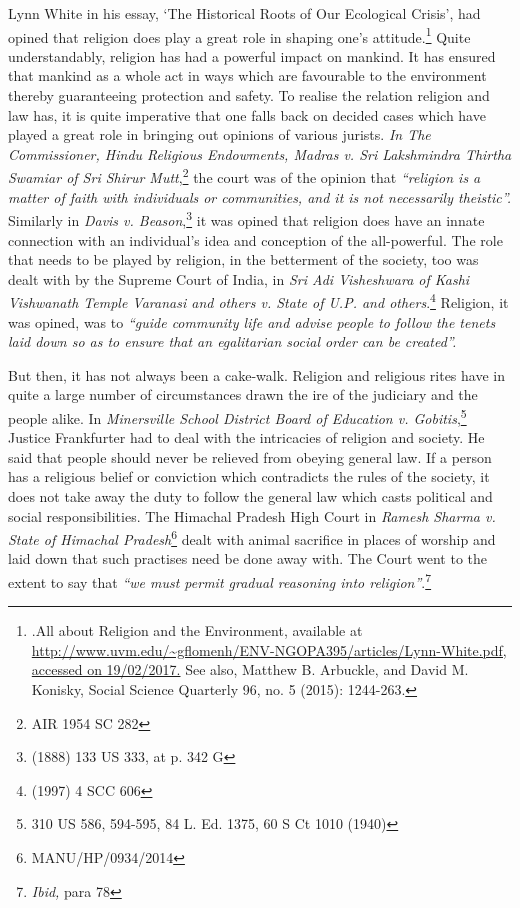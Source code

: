 \begin{multicols}{2}

\noi
Lynn White in his essay, ‘The Historical Roots of Our Ecological Crisis’, had opined that
religion does play a great role in shaping one’s attitude.\footnote{.All about Religion and the Environment, available at \url{http://www.uvm.edu/~gflomenh/ENV-NGOPA395/articles/Lynn-White.pdf, accessed on 19/02/2017.} See also, Matthew B. Arbuckle, and David M. Konisky, Social Science Quarterly 96, no. 5 (2015): 1244-263.} Quite understandably, religion has
had a powerful impact on mankind. It has ensured that mankind as a whole act in ways which
are favourable to the environment thereby guaranteeing protection and safety.
To realise the relation religion and law has, it is quite imperative that one falls back on decided
cases which have played a great role in bringing out opinions of various jurists. \textit{In The
Commissioner, Hindu Religious Endowments, Madras v. Sri Lakshmindra Thirtha Swamiar of
Sri Shirur Mutt},\footnote{AIR 1954 SC 282} the court was of the opinion that \textit{“religion is a matter of faith with individuals or communities, and it is not necessarily theistic”.} Similarly in \textit{Davis v. Beason},\footnote{(1888) 133 US 333, at p. 342 G} it was opined that religion does have an innate connection with an individual’s idea and conception of the all-powerful. The role that needs to be played by religion, in the betterment of the society, too was dealt with by the Supreme Court of India, in \textit{Sri Adi Visheshwara of Kashi Vishwanath Temple Varanasi and others v. State of U.P. and others}.\footnote{(1997) 4 SCC 606} Religion, it was opined, was to \textit{“guide community life and advise people to follow the tenets laid down so as to ensure that an egalitarian social order can be created”.}

\noi
But then, it has not always been a cake-walk. Religion and religious rites have in quite a large
number of circumstances drawn the ire of the judiciary and the people alike. In \textit{Minersville School District Board of Education v. Gobitis},\footnote{310 US 586, 594-595, 84 L. Ed. 1375, 60 S Ct 1010 (1940)} Justice Frankfurter had to deal with the
intricacies of religion and society. He said that people should never be relieved from obeying
general law. If a person has a religious belief or conviction which contradicts the rules of the
society, it does not take away the duty to follow the general law which casts political and social
responsibilities. The Himachal Pradesh High Court in \textit{Ramesh Sharma v. State of Himachal
Pradesh}\footnote{MANU/HP/0934/2014} dealt with animal sacrifice in places of worship and laid down that such practises
need be done away with. The Court went to the extent to say that \textit{“we must permit gradual
reasoning into religion”}.\footnote{\textit{Ibid,} para 78}


\end{multicols}
